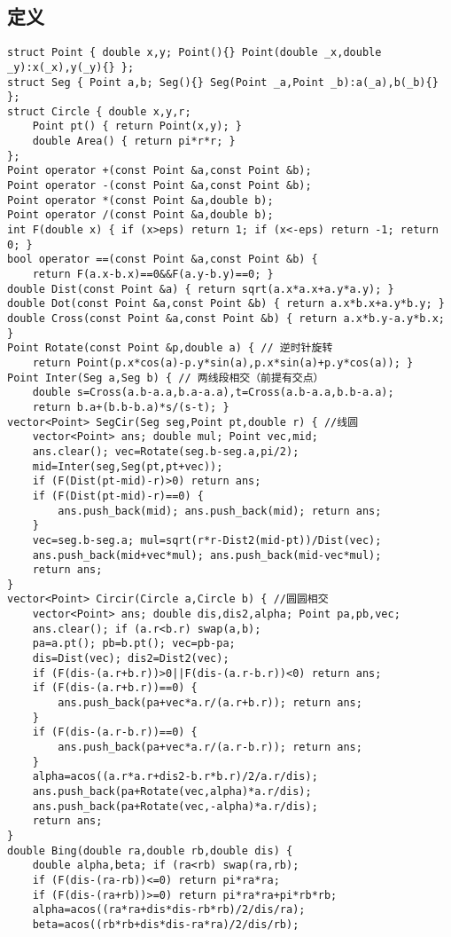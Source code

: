 \documentclass{article}
\begin{document}
\subsection{定义}
\begin{lstlisting}
struct Point { double x,y; Point(){} Point(double _x,double _y):x(_x),y(_y){} };
struct Seg { Point a,b; Seg(){} Seg(Point _a,Point _b):a(_a),b(_b){} };
struct Circle { double x,y,r;
	Point pt() { return Point(x,y); }
	double Area() { return pi*r*r; }
};
Point operator +(const Point &a,const Point &b);
Point operator -(const Point &a,const Point &b);
Point operator *(const Point &a,double b);
Point operator /(const Point &a,double b);
int F(double x) { if (x>eps) return 1; if (x<-eps) return -1; return 0; }
bool operator ==(const Point &a,const Point &b) {
	return F(a.x-b.x)==0&&F(a.y-b.y)==0; }
double Dist(const Point &a) { return sqrt(a.x*a.x+a.y*a.y); }
double Dot(const Point &a,const Point &b) { return a.x*b.x+a.y*b.y; }
double Cross(const Point &a,const Point &b) { return a.x*b.y-a.y*b.x; }
Point Rotate(const Point &p,double a) { // 逆时针旋转
	return Point(p.x*cos(a)-p.y*sin(a),p.x*sin(a)+p.y*cos(a)); }
Point Inter(Seg a,Seg b) { // 两线段相交（前提有交点）
	double s=Cross(a.b-a.a,b.a-a.a),t=Cross(a.b-a.a,b.b-a.a);
	return b.a+(b.b-b.a)*s/(s-t); }
vector<Point> SegCir(Seg seg,Point pt,double r) { //线圆
	vector<Point> ans; double mul; Point vec,mid;
	ans.clear(); vec=Rotate(seg.b-seg.a,pi/2);
	mid=Inter(seg,Seg(pt,pt+vec));
	if (F(Dist(pt-mid)-r)>0) return ans;
	if (F(Dist(pt-mid)-r)==0) {
		ans.push_back(mid); ans.push_back(mid); return ans;
	}
	vec=seg.b-seg.a; mul=sqrt(r*r-Dist2(mid-pt))/Dist(vec);
	ans.push_back(mid+vec*mul); ans.push_back(mid-vec*mul);
	return ans;
}
vector<Point> Circir(Circle a,Circle b) { //圆圆相交
	vector<Point> ans; double dis,dis2,alpha; Point pa,pb,vec;
	ans.clear(); if (a.r<b.r) swap(a,b);
	pa=a.pt(); pb=b.pt(); vec=pb-pa;
	dis=Dist(vec); dis2=Dist2(vec);
	if (F(dis-(a.r+b.r))>0||F(dis-(a.r-b.r))<0) return ans;
	if (F(dis-(a.r+b.r))==0) {
		ans.push_back(pa+vec*a.r/(a.r+b.r)); return ans;
    }
	if (F(dis-(a.r-b.r))==0) {
		ans.push_back(pa+vec*a.r/(a.r-b.r)); return ans;
	}
	alpha=acos((a.r*a.r+dis2-b.r*b.r)/2/a.r/dis);
	ans.push_back(pa+Rotate(vec,alpha)*a.r/dis);
	ans.push_back(pa+Rotate(vec,-alpha)*a.r/dis);
	return ans;
}
double Bing(double ra,double rb,double dis) {
	double alpha,beta; if (ra<rb) swap(ra,rb);
	if (F(dis-(ra-rb))<=0) return pi*ra*ra;
	if (F(dis-(ra+rb))>=0) return pi*ra*ra+pi*rb*rb;
	alpha=acos((ra*ra+dis*dis-rb*rb)/2/dis/ra);
	beta=acos((rb*rb+dis*dis-ra*ra)/2/dis/rb);

\end{lstlisting}
\end{document}
